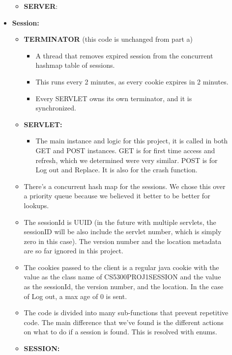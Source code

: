 \documentclass{article}
\begin{document}
\begin{description}
\begin{itemize}
\begin{itemize}
            \item \textbf{SERVER}:%
          \end{itemize}
        \item \textbf{Session:}
          \begin{itemize}
            \item \textbf{TERMINATOR} (this code is unchanged from part a)
              \begin{itemize}
                \item A thread that removes expired session from the concurrent hashmap table of sessions. 
                \item This runs every 2 minutes, as every cookie expires in 2 minutes. 
                \item Every SERVLET owns its own terminator, and it is synchronized.
              \end{itemize}
            \item \textbf{SERVLET:}
              \begin{itemize}
                \item The main instance and logic for this project, it is called in both GET and POST instances. GET is for first time access and refresh, which we determined were very similar. POST is for Log out and Replace. It is also for the crash function.
              \end{itemize}
                \item There's a concurrent hash map for the sessions. We chose this over a priority queue because we believed it better to be better for lookups. 
                \item The sessionId is UUID (in the future with multiple servlets, the sessionID will be also include the servlet number, which is simply zero in this case). The version number and the location metadata are so far ignored in this project.  
                \item The cookies passed to the client is a regular java cookie with the value as the class name of CS5300PROJ1SESSION and the value as the sessionId, the version number, and the location. In the case of Log out, a max age of 0 is sent.
                \item The code is divided into many sub-functions that prevent repetitive code. The main difference that we've found is the different actions on what to do if a session is found. This is resolved with enums. 
            \item \textbf{SESSION:}
              \begin{itemize}

\end{itemize}
\end{itemize}
\end{itemize}
\end{description}
\end{document}
